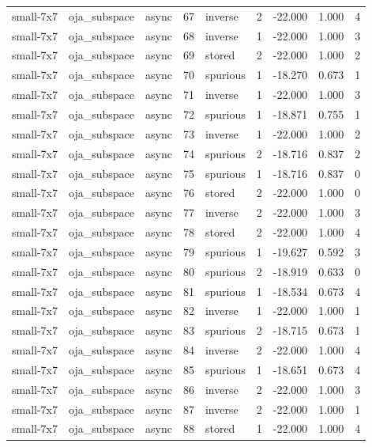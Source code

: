 \begin{tabular}{lllrlrrrr}
small-7x7 & oja\_subspace & async & 67 & inverse & 2 & -22.000 & 1.000 & 4 \\
small-7x7 & oja\_subspace & async & 68 & inverse & 1 & -22.000 & 1.000 & 3 \\
small-7x7 & oja\_subspace & async & 69 & stored & 2 & -22.000 & 1.000 & 2 \\
small-7x7 & oja\_subspace & async & 70 & spurious & 1 & -18.270 & 0.673 & 1 \\
small-7x7 & oja\_subspace & async & 71 & inverse & 1 & -22.000 & 1.000 & 3 \\
small-7x7 & oja\_subspace & async & 72 & spurious & 1 & -18.871 & 0.755 & 1 \\
small-7x7 & oja\_subspace & async & 73 & inverse & 1 & -22.000 & 1.000 & 2 \\
small-7x7 & oja\_subspace & async & 74 & spurious & 2 & -18.716 & 0.837 & 2 \\
small-7x7 & oja\_subspace & async & 75 & spurious & 1 & -18.716 & 0.837 & 0 \\
small-7x7 & oja\_subspace & async & 76 & stored & 2 & -22.000 & 1.000 & 0 \\
small-7x7 & oja\_subspace & async & 77 & inverse & 2 & -22.000 & 1.000 & 3 \\
small-7x7 & oja\_subspace & async & 78 & stored & 2 & -22.000 & 1.000 & 4 \\
small-7x7 & oja\_subspace & async & 79 & spurious & 1 & -19.627 & 0.592 & 3 \\
small-7x7 & oja\_subspace & async & 80 & spurious & 2 & -18.919 & 0.633 & 0 \\
small-7x7 & oja\_subspace & async & 81 & spurious & 1 & -18.534 & 0.673 & 4 \\
small-7x7 & oja\_subspace & async & 82 & inverse & 1 & -22.000 & 1.000 & 1 \\
small-7x7 & oja\_subspace & async & 83 & spurious & 2 & -18.715 & 0.673 & 1 \\
small-7x7 & oja\_subspace & async & 84 & inverse & 2 & -22.000 & 1.000 & 4 \\
small-7x7 & oja\_subspace & async & 85 & spurious & 1 & -18.651 & 0.673 & 4 \\
small-7x7 & oja\_subspace & async & 86 & inverse & 2 & -22.000 & 1.000 & 3 \\
small-7x7 & oja\_subspace & async & 87 & inverse & 2 & -22.000 & 1.000 & 1 \\
small-7x7 & oja\_subspace & async & 88 & stored & 1 & -22.000 & 1.000 & 4 \\

\end{tabular}
